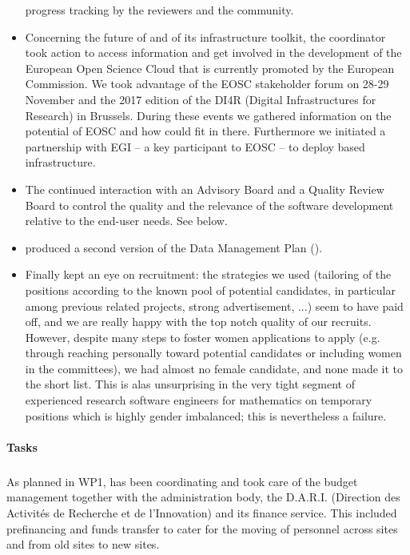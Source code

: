 \begin{itemize}
  progress tracking by the reviewers and the community.
\item Concerning the future of \ODK and of its infrastructure toolkit,
  the coordinator took action to access information and get involved
  in the development of the European Open Science Cloud that is
  currently promoted by the European Commission. We took advantage of
  the EOSC stakeholder forum on 28-29 November and the 2017 edition of
  the DI4R (Digital Infrastructures for Research) in Brussels. During
  these events we gathered information on the potential of EOSC and
  how \ODK could fit in there. Furthermore we initiated a partnership
  with EGI -- a key participant to EOSC -- to deploy \ODK based
  infrastructure.
\item The continued interaction with an Advisory Board and a Quality
  Review Board to control the quality and the relevance of the
  software development relative to the end-user needs. See below.
\item {} produced a second version of the Data Management Plan
  ().
\item Finally  kept an eye on recruitment: the strategies we
  used (tailoring of the positions according to the known pool of
  potential candidates, in particular among previous related projects,
  strong advertisement, ...) seem to have paid off, and we are really
  happy with the top notch quality of our recruits. However, despite
  many steps to foster women applications to apply (e.g. through
  reaching personally toward potential candidates or including women
  in the committees), we had almost no female candidate, and none made
  it to the short list. This is alas unsurprising in the very tight
  segment of experienced research software engineers for mathematics
  on temporary positions which is highly gender imbalanced; this is
  nevertheless a failure.
\end{itemize}


\paragraph{Tasks}

\subparagraph{}

As planned in WP1,  has been coordinating \ODK and took care
of the budget management together with the administration body, the
D.A.R.I. (Direction des Activités de Recherche et de l'Innovation) and
its finance service. This included prefinancing and funds transfer to
cater for the moving of personnel across sites and from old sites to
new sites.


